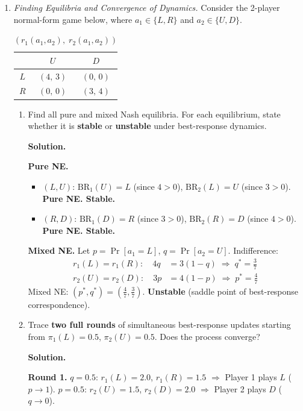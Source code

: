 \documentclass[12pt]{article}
\newenvironment{solution}{%
  \ifshowsolutions\begin{solutionbox}\noindent\textbf{\color{blue!70!black}Solution.}\quad\fi
  \ifshowsolutions\else\expandafter\comment\fi
}{%
  \ifshowsolutions\end{solutionbox}\fi
  \ifshowsolutions\else\expandafter\endcomment\fi
}
\begin{document}
\begin{enumerate}

\item \textit{Finding Equilibria and Convergence of Dynamics.}
Consider the 2-player normal-form game below, where $a_1 \in \{L, R\}$ and $a_2 \in \{U, D\}$.
\begin{table}[H]
  \centering
  \begin{tabular}{|c|c|c|}
    \hline
           & $U$       & $D$       \\\hline
    $L$    & $(4,\,3)$ & $(0,\,0)$ \\\hline
    $R$    & $(0,\,0)$ & $(3,\,4)$ \\\hline
  \end{tabular}
  \caption*{$(r_1(a_1,a_2),\; r_2(a_1,a_2))$}
\end{table}

\begin{enumerate}
  \item Find all pure and mixed Nash equilibria. For each equilibrium, state whether it is \textbf{stable} or \textbf{unstable} under best-response dynamics.

  \begin{solution}
    \textbf{Pure NE.}
    \begin{itemize}
      \item $(L,U)$: $\mathrm{BR}_1(U)=L$ (since $4>0$), $\mathrm{BR}_2(L)=U$ (since $3>0$). \textbf{Pure NE. Stable.}
      \item $(R,D)$: $\mathrm{BR}_1(D)=R$ (since $3>0$), $\mathrm{BR}_2(R)=D$ (since $4>0$). \textbf{Pure NE. Stable.}
    \end{itemize}
    \textbf{Mixed NE.} Let $p=\Pr[a_1=L]$, $q=\Pr[a_2=U]$. Indifference:
    \begin{align*}
      r_1(L)=r_1(R):\quad 4q &= 3(1-q) \;\Rightarrow\; q^* = \tfrac{3}{7}\\
      r_2(U)=r_2(D):\quad 3p &= 4(1-p) \;\Rightarrow\; p^* = \tfrac{4}{7}
    \end{align*}
    Mixed NE: $(p^*,q^*)=(\tfrac{4}{7},\tfrac{3}{7})$. \textbf{Unstable} (saddle point of best-response correspondence).
  \end{solution}

  \item Trace \textbf{two full rounds} of simultaneous best-response updates starting from $\pi_1(L)=0.5$, $\pi_2(U)=0.5$. Does the process converge?

  \begin{solution}
    \textbf{Round 1.} $q=0.5$: $r_1(L)=2.0$, $r_1(R)=1.5$ $\Rightarrow$ Player 1 plays $L$ ($p\to1$). $p=0.5$: $r_2(U)=1.5$, $r_2(D)=2.0$ $\Rightarrow$ Player 2 plays $D$ ($q\to0$).


\end{solution}
\end{enumerate}
\end{enumerate}
\end{document}
